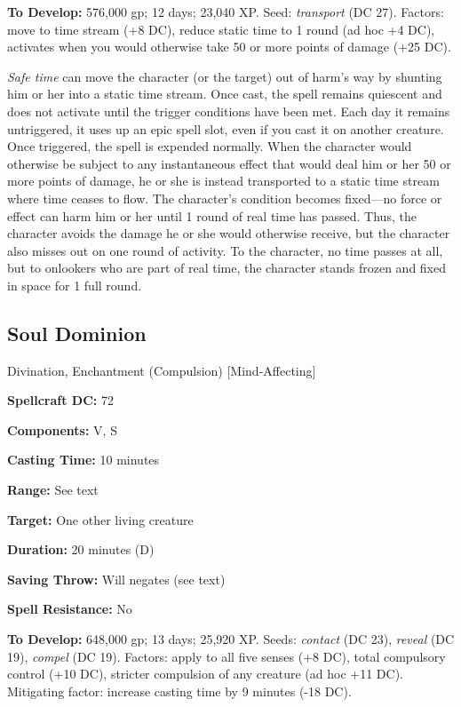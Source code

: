 \documentclass{article}
\begin{document}
\textbf{To Develop:} 576,000 gp; 12 days; 23,040 XP. Seed: \textit{transport }(DC 
27). Factors: move to time stream (+8 DC), reduce static time to 1 round (ad hoc 
+4 DC), activates when you would otherwise take 50 or more points of damage (+25 
DC). 

\textit{Safe time }can move the character (or the target) out of harm's way by 
shunting him or her into a static time stream. Once cast, the spell remains quiescent 
and does not activate until the trigger conditions have been met. Each day it remains 
untriggered, it uses up an epic spell slot, even if you cast it on another creature. 
Once triggered, the spell is expended normally. When the character would otherwise 
be subject to any instantaneous effect that would deal him or her 50 or more points 
of damage, he or she is instead transported to a static time stream where time 
ceases to flow. The character's condition becomes fixed---no force or effect can 
harm him or her until 1 round of real time has passed. Thus, the character avoids 
the damage he or she would otherwise receive, but the character also misses out 
on one round of activity. To the character, no time passes at all, but to onlookers 
who are part of real time, the character stands frozen and fixed in space for 1 
full round. 

\vspace{12pt}
\subsection*{Soul Dominion }

Divination, Enchantment (Compulsion) [Mind-Affecting] 

\textbf{Spellcraft DC:} 72 

\textbf{Components:} V, S 

\textbf{Casting Time:} 10 minutes 

\textbf{Range:} See text 

\textbf{Target:} One other living creature 

\textbf{Duration:} 20 minutes (D) 

\textbf{Saving Throw:} Will negates (see text) 

\textbf{Spell Resistance:} No 

\textbf{To Develop:} 648,000 gp; 13 days; 25,920 XP. Seeds: \textit{contact }(DC 
23), \textit{reveal }(DC 19), \textit{compel }(DC 19). Factors: apply to all five 
senses (+8 DC), total compulsory control (+10 DC), stricter compulsion of any creature 
(ad hoc +11 DC). Mitigating factor: increase casting time by 9 minutes (-18 DC). 
\end{document}
